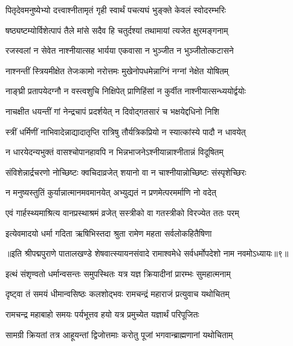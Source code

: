 \twolineshloka
{पितृदेवमनुष्येभ्यो दत्त्वाश्नीतामृतं गृही}
{स्वार्थं पचत्यघं भुङ्क्ते केवलं स्वोदरम्भरिः}%

\twolineshloka
{षष्ठ्यष्टम्योर्विशेत्पापं तैले मांसे सदैव हि}
{चतुर्दश्यां तथामायां त्यजेत क्षुरमङ्गनाम्}%

\twolineshloka
{रजस्वलां न सेवेत नाश्नीयात्सह भार्यया}
{एकवासा न भुञ्जीत न भुञ्जीतोत्कटासने}%

\twolineshloka
{नाश्नन्तीं स्त्रियमीक्षेत तेजःकामो नरोत्तमः}
{मुखेनोपधमेन्नाग्निं नग्नां नेक्षेत योषितम्}%

\twolineshloka
{नाङ्घ्री प्रतापयेदग्नौ न वस्त्वशुचि निक्षिपेत्}
{प्राणिहिंसां न कुर्वीत नाश्नीयात्सन्ध्ययोर्द्वयोः}%

\twolineshloka
{नाचक्षीत धयन्तीं गां नेन्द्रचापं प्रदर्शयेत्}
{न दिवोद्गतसारं च भक्षयेद्दधिनो निशि}%

\twolineshloka
{स्त्रीं धर्मिणीं नाभिवादेन्नाद्यादातृप्ति रात्रिषु}
{तौर्यत्रिकप्रियो न स्यात्कांस्ये पादौ न धावयेत्}%

\twolineshloka
{न धारयेदन्यभुक्तं वासश्चोपानहावपि}
{न भिन्नभाजनेऽश्नीयान्नाश्नीतान्नं विदूषितम्}%

\twolineshloka
{संविशेन्नार्द्रचरणो नोच्छिष्टः क्वचिदाव्रजेत्}
{शयानो वा न चाश्नीयान्नोच्छिष्टः संस्पृशेच्छिरः}%

\twolineshloka
{न मनुष्यस्तुतिं कुर्यान्नात्मानमवमानयेत्}
{अभ्युद्यतं न प्रणमेत्परमर्माणि नो वदेत्}%

\twolineshloka
{एवं गार्हस्थ्यमाश्रित्य वानप्रस्थाश्रमं व्रजेत्}
{सस्त्रीको वा गतस्त्रीको विरज्येत ततः परम्}%

\twolineshloka
{इत्येवमादयो धर्मा गदिता ऋषिभिस्तदा}
{श्रुता रामेण महता सर्वलोकहितैषिणा}%

{॥इति श्रीपद्मपुराणे पातालखण्डे शेषवात्स्यायनसंवादे रामाश्वमेधे सर्वधर्मोपदेशो नाम नवमोऽध्यायः॥९॥}



\twolineshloka
{इत्थं संशृण्वतो धर्मान्वसन्तः समुपस्थितः}
{यत्र यज्ञ क्रियादीनां प्रारम्भः सुमहात्मनाम्}%

\twolineshloka
{दृष्ट्वा तं समयं धीमान्वसिष्ठः कलशोद्भवः}
{रामचन्द्रं महाराजं प्रत्युवाच यथोचितम्}%


\twolineshloka
{रामचन्द्र महाबाहो समयः पर्यभूत्तव}
{हयो यत्र प्रमुच्येत यज्ञार्थं परिपूजितः}%

\twolineshloka
{सामग्री क्रियतां तत्र आहूयन्तां द्विजोत्तमाः}
{करोतु पूजां भगवान्ब्राह्मणानां यथोचिताम्}%

